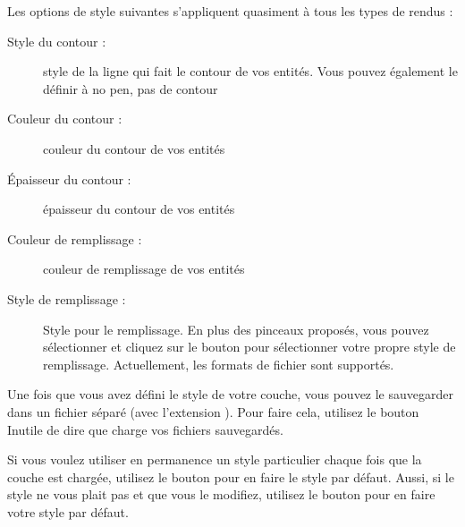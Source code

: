 Les options de style suivantes s'appliquent quasiment à tous les types de rendus :
\begin{description}
\item[Style du contour :] style de la ligne qui fait le contour de vos entités. Vous pouvez également le définir à \og no pen\fg, pas de contour
\item[Couleur du contour :] couleur du contour de vos entités
\item[Épaisseur du contour :] épaisseur du contour de vos entités
\item[Couleur de remplissage :] couleur de remplissage de vos entités
\item[Style de remplissage :] Style pour le remplissage. En plus des pinceaux proposés, vous pouvez sélectionner  et cliquez sur le \browsebutton bouton pour sélectionner votre propre style de remplissage. Actuellement, les formats de fichier  sont supportés.
\end{description}

Une fois que vous avez défini le style de votre couche, vous pouvez le sauvegarder dans un fichier séparé (avec l'extension ). Pour faire cela, utilisez le bouton  Inutile de dire que  charge vos fichiers sauvegardés.

Si vous voulez utiliser en permanence un style particulier chaque fois que la couche est chargée, utilisez le bouton  pour en faire le style par défaut. Aussi, si le style ne vous plait pas et que vous le modifiez, utilisez le bouton  pour en faire votre style par défaut.

